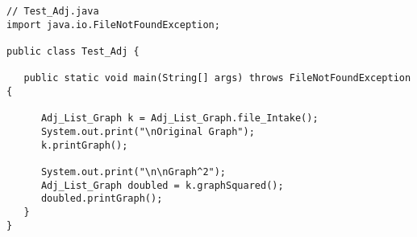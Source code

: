 \documentclass[11pt]{article}
\begin{document}
\lstset{
    basicstyle=\ttfamily\footnotesize,
    breaklines=true,
    frame=single,
    numbers=left,
    tabsize=4,
    showstringspaces=false,
    language=Java
}
\begin{lstlisting}
// Test_Adj.java
import java.io.FileNotFoundException;

public class Test_Adj {

   public static void main(String[] args) throws FileNotFoundException {

      Adj_List_Graph k = Adj_List_Graph.file_Intake();
      System.out.print("\nOriginal Graph");
      k.printGraph();

      System.out.print("\n\nGraph^2");
      Adj_List_Graph doubled = k.graphSquared();
      doubled.printGraph();
   }
}

\end{lstlisting}
\end{document}
